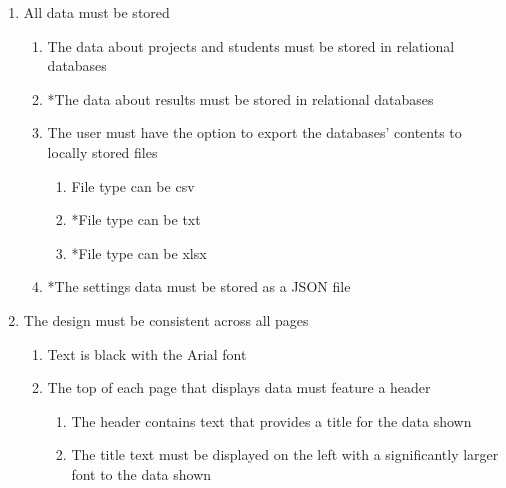 \documentclass{article}
\begin{document}
\begin{enumerate}
\begin{enumerate}
\begin{enumerate}
                \item Projects are displayed in alphabetical order
                \item The students in each group are displayed in alphabetical order
            \end{enumerate}
            \item *Both above options can be exported to locally stored files
            \begin{enumerate}
                \item *File type can be csv
                \item *File type can be txt
                \item *File type can be xlsx
            \end{enumerate}
        \end{enumerate}
    \item All data must be stored
    \begin{enumerate}
        \item The data about projects and students must be stored in relational databases
        \item *The data about results must be stored in relational databases
        \item The user must have the option to export the databases' contents to locally stored files
        \begin{enumerate}
            \item File type can be csv
            \item *File type can be txt
            \item *File type can be xlsx
        \end{enumerate}
        \item *The settings data must be stored as a JSON file
    \end{enumerate}
    \item The design must be consistent across all pages
    \begin{enumerate}
        \item Text is black with the Arial font
        \item The top of each page that displays data must feature a header
        \begin{enumerate}
            \item The header contains text that provides a title for the data shown
            \item The title text must be displayed on the left with a significantly larger font to the data shown

\end{enumerate}
\end{enumerate}
\end{enumerate}
\end{document}
